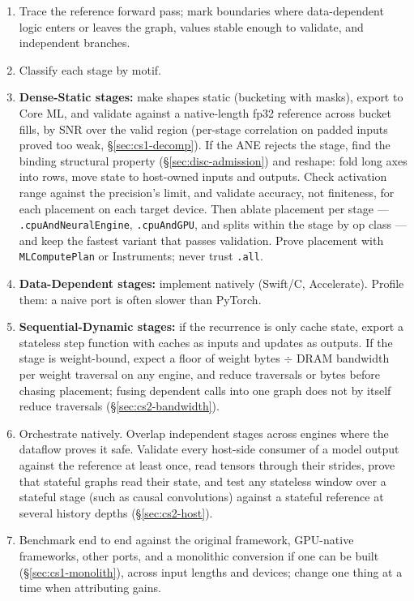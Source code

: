 \documentclass[11pt]{article}
\newcommand{\code}[1]{\texttt{#1}}
\begin{document}
\begin{enumerate}[leftmargin=*,label=\arabic*.]
\item Trace the reference forward pass; mark boundaries where data-dependent logic enters or leaves the graph, values stable enough to validate, and independent branches.
\item Classify each stage by motif.
\item \textbf{Dense-Static stages:} make shapes static (bucketing with masks), export to Core ML, and validate against a native-length fp32 reference across bucket fills, by SNR over the valid region (per-stage correlation on padded inputs proved too weak, \S\ref{sec:cs1-decomp}). If the ANE rejects the stage, find the binding structural property (\S\ref{sec:disc-admission}) and reshape: fold long axes into rows, move state to host-owned inputs and outputs. Check activation range against the precision's limit, and validate accuracy, not finiteness, for each placement on each target device. Then ablate placement per stage --- \code{.cpuAndNeuralEngine}, \code{.cpuAndGPU}, and splits within the stage by op class --- and keep the fastest variant that passes validation. Prove placement with \code{MLComputePlan} or Instruments; never trust \code{.all}.
\item \textbf{Data-Dependent stages:} implement natively (Swift/C, Accelerate). Profile them: a naive port is often slower than PyTorch.
\item \textbf{Sequential-Dynamic stages:} if the recurrence is only cache state, export a stateless step function with caches as inputs and updates as outputs. If the stage is weight-bound, expect a floor of weight bytes $\div$ DRAM bandwidth per weight traversal on any engine, and reduce traversals or bytes before chasing placement; fusing dependent calls into one graph does not by itself reduce traversals (\S\ref{sec:cs2-bandwidth}).
\item Orchestrate natively. Overlap independent stages across engines where the dataflow proves it safe. Validate every host-side consumer of a model output against the reference at least once, read tensors through their strides, prove that stateful graphs read their state, and test any stateless window over a stateful stage (such as causal convolutions) against a stateful reference at several history depths (\S\ref{sec:cs2-host}).
\item Benchmark end to end against the original framework, GPU-native frameworks, other ports, and a monolithic conversion if one can be built (\S\ref{sec:cs1-monolith}), across input lengths and devices; change one thing at a time when attributing gains.
\end{enumerate}
\end{document}
